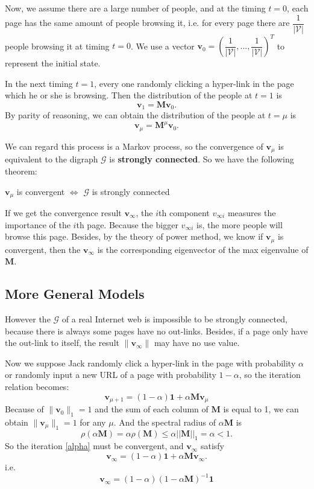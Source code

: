 	Now, we assume there are a large number of people, and at the timing $t=0$, each page has the same amount of people browsing it, i.e. for every page there are $\dfrac 1{|\mathcal V|}$ people browsing it at timing $t=0$. We use a vector $\mathbf v_0 =(\dfrac 1{|\mathcal V|},...,\dfrac 1{|\mathcal V|})^T$ to represent the initial state. 
	
	In the next timing $t=1$, every one randomly clicking a hyper-link in the page which he or she is browsing. Then the distribution of the people at $t=1$ is $$\mathbf v_1=\mathbf M\mathbf v_0.$$ By parity of reasoning, we can obtain the distribution of the people at $t=\mu$ is  $$\mathbf v_\mu=\mathbf M^\mu\mathbf v_0.$$
	
	We can regard this process is a Markov process, so the convergence of $\mathbf v_\mu$ is equivalent to the digraph $\mathcal G$ is \textbf{strongly connected}. So we have the following theorem:
	
	
	\begin{theorem}
		 $\mathbf v_\mu$ is convergent $\Leftrightarrow$ $\mathcal G$ is strongly connected
	\end{theorem}
	If we get the convergence result $\mathbf v_\infty$, the $i$th component $v_{\infty i}$ measures the importance of the $i$th page. Because the bigger $v_{\infty i}$ is, the more people will browse this page.
	Besides, by the theory of power method, we know if $\mathbf v_\mu$ is convergent, then the $\mathbf v_\infty$ is the corresponding eigenvector of the max eigenvalue of $\mathbf M$. 
	\subsection{More General Models}
	However the $\mathcal G$ of a real Internet web is impossible to be strongly connected, because there is always some pages have no out-links. Besides, if a page only have the out-link to itself, the result $\|\mathbf v_\infty\|$ may have no use value.
	
	Now we suppose Jack randomly click a hyper-link in the page with probability $\alpha$ or randomly input a new URL of a page with probability $1-\alpha$, so the iteration relation becomes:
	\begin{equation}\label{alpha}
	\mathbf v_{\mu+1}=(1-\alpha)\mathbf 1 +\alpha \mathbf M \mathbf v_\mu
	\end{equation}
	Because of $\|\mathbf v_0\|_1=1$ and the sum of each column of $\mathbf M$ is equal to 1, we can obtain $\|\mathbf v_\mu\|_1=1$ for any $\mu$. And the spectral radius of $\alpha \mathbf M$ is $$\rho(\alpha \mathbf M)=\alpha\rho(\mathbf M)\leq\alpha ||\mathbf M||_1=\alpha <1.$$ So the iteration \eqref{alpha} must be convergent, and $\mathbf v_\infty$ satisfy$$ 	\mathbf v_{\infty}=(1-\alpha)\mathbf 1 +\alpha \mathbf M \mathbf v_\infty.$$ 
	i.e.
	$$\mathbf v_\infty = (1-\alpha)(1-\alpha \mathbf M)^{-1}\mathbf 1 $$
